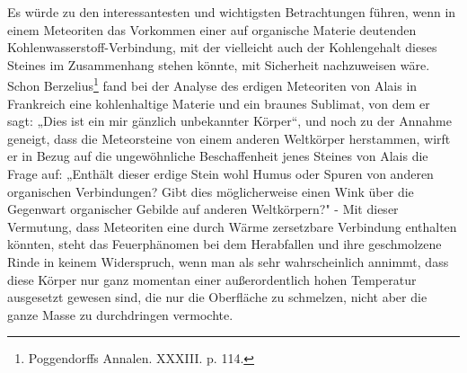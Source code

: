 \documentclass[a4paper, 11pt, oneside]{article}
\begin{document}
Es würde zu den interessantesten und wichtigsten Betrachtungen führen, wenn in einem Meteoriten das Vorkommen einer auf organische Materie deutenden Kohlenwasserstoff-Verbindung, mit der vielleicht auch der Kohlengehalt dieses Steines im Zusammenhang stehen könnte, mit Sicherheit nachzuweisen wäre. Schon Berzelius\footnote{Poggendorffs Annalen. XXXIII. p. 114.} fand bei der Analyse des erdigen Meteoriten von Alais in Frankreich eine kohlenhaltige Materie und ein braunes Sublimat, von dem er sagt: „Dies ist ein mir gänzlich unbekannter Körper“, und noch zu der Annahme geneigt, dass die Meteorsteine von einem anderen Weltkörper herstammen, wirft er in Bezug auf die ungewöhnliche Beschaffenheit jenes Steines von Alais die Frage auf: „Enthält dieser erdige Stein wohl Humus oder Spuren von anderen organischen Verbindungen? Gibt dies möglicherweise einen Wink über die Gegenwart organischer Gebilde auf anderen Weltkörpern?" - Mit dieser Vermutung, dass Meteoriten eine durch Wärme zersetzbare Verbindung enthalten könnten, steht das Feuerphänomen bei dem Herabfallen und ihre geschmolzene Rinde in keinem Widerspruch, wenn man als sehr wahrscheinlich annimmt, dass diese Körper nur ganz momentan einer außerordentlich hohen Temperatur ausgesetzt gewesen sind, die nur die Oberfläche zu schmelzen, nicht aber die ganze Masse zu durchdringen vermochte.
\clearpage
\end{document}
